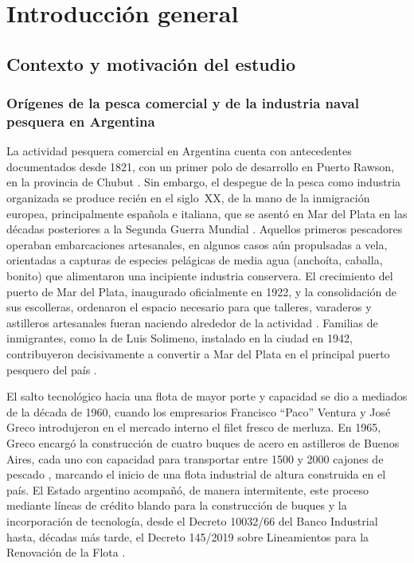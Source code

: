 \chapter{Introducción general}
\minitoc
\section{Contexto y motivación del estudio}
\label{sec:contexto}

\subsection{Orígenes de la pesca comercial y de la industria naval pesquera en Argentina}

La actividad pesquera comercial en Argentina cuenta con antecedentes documentados
desde 1821, con un primer polo de desarrollo en Puerto Rawson, en la provincia de
Chubut \citep{phantom_pesca_argentina}. Sin embargo, el despegue de la pesca como
industria organizada se produce recién en el siglo~XX, de la mano de la
inmigración europea, principalmente española e italiana, que se asentó en
Mar del Plata en las décadas posteriores a la Segunda Guerra Mundial
\citep{phantom_pesca_argentina}. Aquellos primeros pescadores operaban
embarcaciones artesanales, en algunos casos aún propulsadas a vela, orientadas a
capturas de especies pelágicas de media agua (anchoíta, caballa, bonito) que
alimentaron una incipiente industria conservera. El crecimiento del puerto de
Mar del Plata, inaugurado oficialmente en 1922, y la consolidación de sus
escolleras, ordenaron el espacio necesario para que talleres, varaderos y
astilleros artesanales fueran naciendo alrededor de la actividad
\citep{confluencia_portuaria_mdp}. Familias de inmigrantes, como la de Luis
Solimeno, instalado en la ciudad en 1942, contribuyeron decisivamente a
convertir a Mar del Plata en el principal puerto pesquero del país
\citep{argenports_solimeno}.

El salto tecnológico hacia una flota de mayor porte y capacidad se dio a
mediados de la década de 1960, cuando los empresarios Francisco ``Paco''
Ventura y José Greco introdujeron en el mercado interno el filet fresco de
merluza. En 1965, Greco encargó la construcción de cuatro buques de acero en
astilleros de Buenos Aires, cada uno con capacidad para transportar entre
1500 y 2000 cajones de pescado \citep{phantom_pesca_argentina}, marcando el
inicio de una flota industrial de altura construida en el país. El Estado
argentino acompañó, de manera intermitente, este proceso mediante líneas de
crédito blando para la construcción de buques y la incorporación de
tecnología, desde el Decreto 10032/66 del Banco Industrial hasta,
décadas más tarde, el Decreto 145/2019 sobre Lineamientos para la Renovación
de la Flota \citep{phantom_pesca_argentina}.

